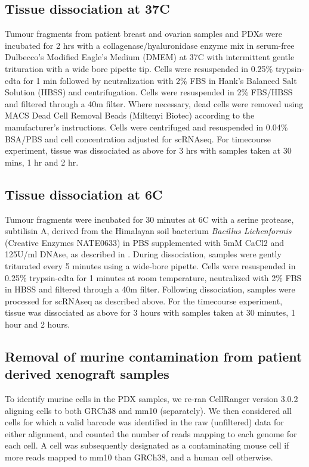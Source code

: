 \subsection{Tissue dissociation at 37\textdegree C}
Tumour fragments from patient breast and ovarian samples and PDXs were incubated for 2 hrs with a collagenase/hyaluronidase enzyme mix in serum-free Dulbecco's Modified Eagle's Medium (DMEM) at 37\textdegree C with intermittent gentle trituration with a wide bore pipette tip. Cells were resuspended in 0.25\% trypsin-edta for 1 min followed by neutralization with 2\% FBS in Hank's Balanced Salt Solution (HBSS) and centrifugation. Cells were resuspended in 2\% FBS/HBSS and filtered through a 40\textmu m filter. Where necessary, dead cells were removed using MACS Dead Cell Removal Beads (Miltenyi Biotec) according to the manufacturer's instructions. Cells were centrifuged and resuspended in 0.04\%  BSA/PBS and cell concentration adjusted for scRNAseq. For timecourse experiment, tissue was dissociated as above for 3 hrs with samples taken at 30 mins, 1 hr and 2 hr.

\subsection{Tissue dissociation at 6\textdegree C}
Tumour fragments were incubated for 30 minutes at 6\textdegree C with a serine protease, subtilisin A, derived from the Himalayan soil bacterium \textit{Bacillus Lichenformis} (Creative Enzymes NATE0633) in PBS supplemented with 5mM CaCl2 and 125U/ml DNAse, as described in \cite{adam2017psychrophilic, potter2019dissociation}. During dissociation, samples were gently triturated every 5 minutes using a wide-bore pipette. Cells were resuspended in 0.25\% trypsin-edta for 1 minutes at room temperature, neutralized with 2\% FBS in HBSS and filtered through a 40\textmu m filter. Following dissociation, samples were processed for scRNAseq as described above. For the timecourse experiment, tissue was dissociated as above for 3 hours with samples taken at 30 minutes, 1 hour and 2 hours. 

\subsection{Removal of murine contamination from patient derived xenograft samples}

To identify murine cells in the PDX samples, we re-ran CellRanger version 3.0.2 aligning cells to both GRCh38 and mm10 (separately). We then considered all cells for which a valid barcode was identified in the raw (unfiltered) data for either alignment, and counted the number of reads mapping to each genome for each cell. A cell was subsequently designated as a contaminating mouse cell if more reads mapped to mm10 than GRCh38, and a human cell otherwise.

